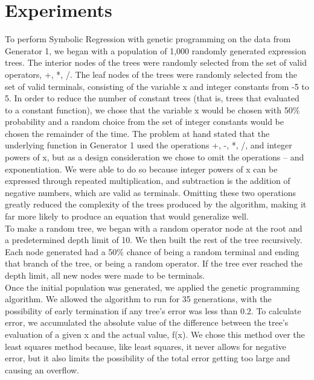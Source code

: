 
\section{Experiments}
\label{sec:expts}

	To perform Symbolic Regression with genetic programming on the
        data from Generator 1, we began with a population of 1,000
        randomly generated expression trees. The interior nodes of the
        trees were randomly selected from the set of valid operators,
        {+, *, /}. The leaf nodes of the trees were randomly selected
        from the set of valid terminals, consisting of the variable x
        and integer constants from -5 to 5. In order to reduce the
        number of constant trees (that is, trees that evaluated to a
        constant function), we chose that the variable x would be
        chosen with 50\% probability and a random choice from the set
        of integer constants would be chosen the remainder of the
        time. The problem at hand stated that the underlying function
        in Generator 1 used the operations +, -, *, /, and integer
        powers of x, but as a design consideration we chose to omit
        the operations – and exponentiation. We were able to do so
        because integer powers of x can be expressed through repeated
        multiplication, and subtraction is the addition of negative
        numbers, which are valid as terminals. Omitting these two
        operations greatly reduced the complexity of the trees
        produced by the algorithm, making it far more likely to
        produce an equation that would generalize well.\\

	To make a random tree, we began with a random operator node at
        the root and a predetermined depth limit of 10. We then built
        the rest of the tree recursively. Each node generated had a
        50\% chance of being a random terminal and ending that branch
        of the tree, or being a random operator. If the tree ever
        reached the depth limit, all new nodes were made to be
        terminals.\\

	Once the initial population was generated, we applied the
        genetic programming algorithm. We allowed the algorithm to run
        for 35 generations, with the possibility of early termination
        if any tree’s error was less than 0.2. To calculate error, we
        accumulated the absolute value of the difference between the
        tree’s evaluation of a given x and the actual value, f(x). We
        chose this method over the least squares method because, like
        least squares, it never allows for negative error, but it also
        limits the possibility of the total error getting too large
        and causing an overflow.\\

